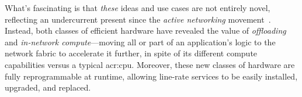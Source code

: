 What's fascinating is that \emph{these} ideas and use cases are not entirely novel, reflecting an undercurrent present since the \emph{active networking} movement~\parencite{DBLP:journals/ccr/TennenhouseW96}.
Instead, both classes of efficient hardware have revealed the value of \emph{offloading} and \emph{in-network compute}---moving all or part of an application's logic to the network fabric to accelerate it further, in spite of its different compute capabilities versus a typical \gls{acr:cpu}.
Moreover, these new classes of hardware are fully reprogrammable at runtime, allowing line-rate services to be easily installed, upgraded, and replaced.




